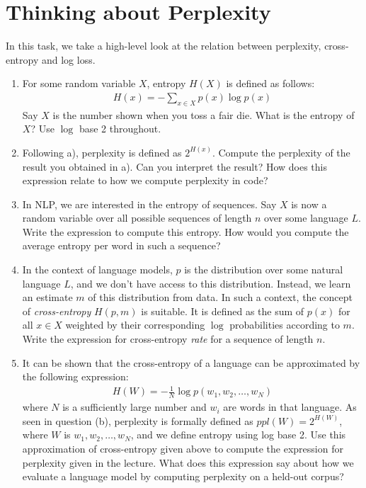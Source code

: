 \documentclass[11pt,a4paper]{article}
\begin{document}
\section{Thinking about Perplexity}

In this task, we take a high-level look at the relation between perplexity,
cross-entropy and log loss.

\begin{enumerate}[label=(\alph*)]
    \item For some random variable $X$, entropy $H(X)$ is defined as follows:
          \begin{align}\label{eq:def_entropy}
              H(x) = -\sum_{x\in X} p(x)\log p(x)
          \end{align}
          Say $X$ is the number shown when you toss a fair die.
          What is the entropy of $X$?
          Use $\log$ base 2 throughout.
    \item Following a), perplexity is defined as $2^{H(x)}$. Compute the
          perplexity of the result you obtained in a).
          Can you interpret the result?
          How does this expression relate to how we compute perplexity in code?
    \item In NLP, we are interested in the entropy of sequences.
          Say $X$ is now a random variable over all possible sequences of length
          $n$ over some language $L$.
          Write the expression to compute this entropy.
          How would you compute the average entropy per word in such a sequence?
    \item In the context of language models, $p$ is the distribution over some
          natural language $L$, and we don't have access to this distribution.
          Instead, we learn an estimate $m$ of this distribution from data.
          In such a context, the concept of \emph{cross-entropy} $H(p,m)$ is
          suitable.
          It is defined as the sum of $p(x)$ for all $x\in X$ weighted by their
          corresponding $\log$ probabilities according to $m$.
          Write the expression for cross-entropy \emph{rate} for a sequence of 
          length $n$.
    \item It can be shown that the cross-entropy of a language can be
          approximated by the following expression:
          \begin{align}\label{eq:language_entropy}
              H(W) = -\frac{1}{N} \log p(w_1,w_2,\ldots,w_N)
          \end{align}
          where $N$ is a sufficiently large number and $w_i$ are words in that
          language.
          As seen in question (b), perplexity is formally defined as
          $ppl(W) = 2^{H(W)}$, where $W$ is $w_1, w_2, \ldots, w_N$, and we
          define entropy using log base 2.
          Use this approximation of cross-entropy given above to compute the
          expression for perplexity given in the lecture.
          What does this expression say about how we evaluate a language
          model by computing perplexity on a held-out corpus?
\end{enumerate}
\end{document}

